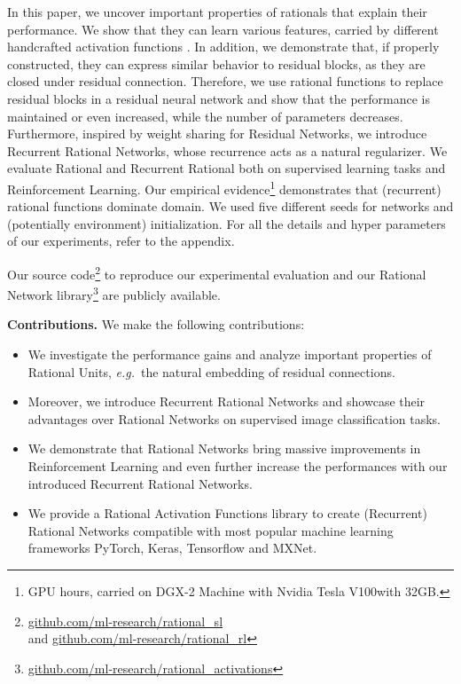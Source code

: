 \documentclass{article}
\newcommand{\eg}{\emph{e.g.}~}
\begin{document}
In this paper, we uncover important properties of rationals that explain their performance. We show that they can learn various features, carried by different handcrafted activation functions \cite{clevert2016fast,elfwing2018sigmoid,RamachandranSearching,Misra20,georgescu2020non}. 
In addition, we demonstrate that, if properly constructed, they can express similar behavior to residual blocks, as they are closed under residual connection. Therefore, we use rational functions to replace residual blocks in a residual neural network and show that the performance is maintained or even increased, while the number of parameters decreases. Furthermore, inspired by weight sharing for Residual Networks, we introduce Recurrent Rational Networks, whose recurrence acts as a natural regularizer. We evaluate Rational and Recurrent Rational both on supervised learning tasks and Reinforcement Learning. Our empirical evidence\footnote{ GPU hours, carried on DGX-2 Machine with Nvidia Tesla V100with 32GB.} demonstrates that (recurrent) rational functions dominate domain. We used five different seeds for networks and (potentially environment) initialization. For all the details and hyper parameters of our experiments, refer to the appendix.

Our source code\footnote{\url{github.com/ml-research/rational_sl}\\ and \url{github.com/ml-research/rational_rl}} to reproduce our experimental evaluation and our Rational Network library\footnote{\url{github.com/ml-research/rational_activations}}  
are publicly available. 

\textbf{Contributions.}
We make the following contributions: 
\begin{itemize}
\item We investigate the performance gains and analyze important properties of Rational Units, \eg the natural embedding of residual connections. 
\item Moreover, we introduce Recurrent Rational Networks and showcase their advantages over Rational Networks on supervised image classification tasks.
\item We demonstrate that Rational Networks bring massive improvements in Reinforcement Learning and even further increase the performances with our introduced Recurrent Rational Networks.
\item We provide a Rational Activation Functions library to create (Recurrent) Rational Networks compatible with most popular machine learning frameworks PyTorch, Keras, Tensorflow and MXNet.
\end{itemize}
\end{document}
